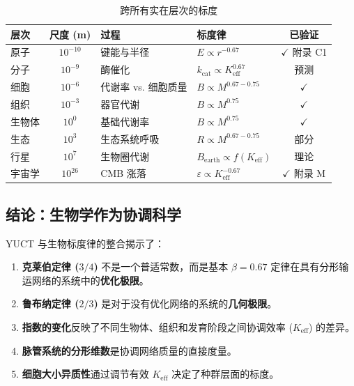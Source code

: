 \documentclass[12pt]{article}
\newcommand{\Keff}{K_{\mathrm{eff}}}
\begin{document}
	\begin{table}[htbp]
		\centering
		\caption{跨所有实在层次的标度}
		\label{tab:unified-hierarchy}
		\begin{tabular}{p{3cm} c p{4cm} p{3cm} c}
			\toprule
			\textbf{层次} & \textbf{尺度 (m)} & \textbf{过程} & \textbf{标度律} & \textbf{已验证} \\
			\midrule
			原子 & \(10^{-10}\) & 键能与半径 & \(E \propto r^{-0.67}\) & $\checkmark$ 附录 C1 \\
			分子 & \(10^{-9}\)  & 酶催化        & \(k_{\text{cat}} \propto \Keff^{0.67}\) & 预测 \\
			细胞 & \(10^{-6}\)  & 代谢率 vs. 细胞质量 & \(B \propto M^{0.67-0.75}\) & $\checkmark$ \cite{Takemoto2015} \\
			组织 & \(10^{-3}\)  & 器官代谢        & \(B \propto M^{0.75}\) & $\checkmark$ \cite{West2002} \\
			生物体 & \(10^{0}\)   & 基础代谢率    & \(B \propto M^{0.75}\) & $\checkmark$ \cite{Kleiber1932} \\
			生态 & \(10^{3}\)   & 生态系统呼吸   & \(R \propto M^{0.67-0.75}\) & 部分 \\
			行星 & \(10^{7}\)   & 生物圈代谢    & \(B_{\text{earth}} \propto f(\Keff)\) & 理论 \\
			宇宙学 & \(10^{26}\)  & CMB 涨落        & \(\varepsilon \propto \Keff^{-0.67}\) & $\checkmark$ 附录 M \\
			\bottomrule
		\end{tabular}
	\end{table}
	
	\subsection{结论：生物学作为协调科学}
	
	YUCT 与生物标度律的整合揭示了：
	
	\begin{enumerate}
		\item \textbf{克莱伯定律 (\(3/4\))} 不是一个普适常数，而是基本 \(\beta = 0.67\) 定律在具有分形输运网络的系统中的\textbf{优化极限}。
		\item \textbf{鲁布纳定律 (\(2/3\))} 是对于没有优化网络的系统的\textbf{几何极限}。
		\item \textbf{指数的变化}反映了不同生物体、组织和发育阶段之间协调效率 (\(\Keff\)) 的差异。
		\item \textbf{脉管系统的分形维数}是协调网络质量的直接度量。
		\item \textbf{细胞大小异质性}通过调节有效 \(\Keff\) 决定了种群层面的标度。
	\end{enumerate}
	
\end{document}
